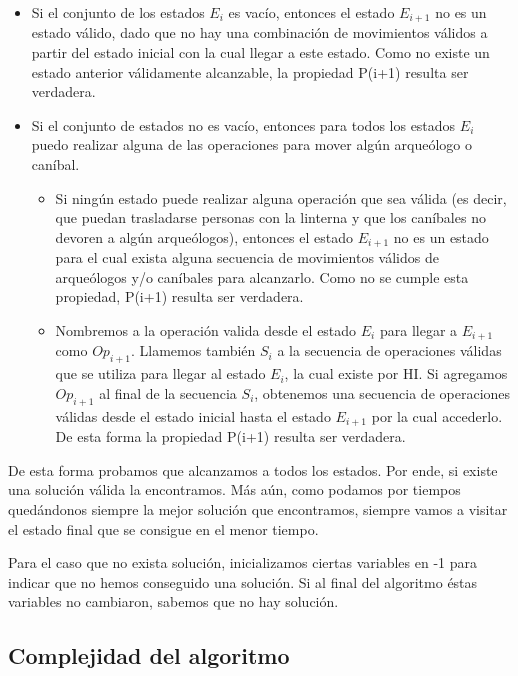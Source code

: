 \begin{itemize}
    \item Si el conjunto de los estados $E_i$ es vacío, entonces el estado $E_{i+1}$ no es un estado válido, dado que no hay una combinación de movimientos válidos a partir del estado inicial con la cual llegar a este estado. Como no existe un estado anterior válidamente alcanzable, la propiedad P(i+1) resulta ser verdadera.

    \item Si el conjunto de estados no es vacío, entonces para todos los estados $E_{i}$ puedo realizar alguna de las operaciones para mover algún arqueólogo o caníbal. 
    \begin{itemize}
    \item Si ningún estado puede realizar alguna operación que sea válida (es decir, que puedan trasladarse personas con la linterna y que los caníbales no devoren a alg\'un arqueólogos), entonces el estado $E_{i+1}$ no es un estado para el cual exista alguna secuencia de movimientos válidos de arqueólogos y/o caníbales para alcanzarlo. Como no se cumple esta propiedad, P(i+1) resulta ser verdadera.
    
    \item Nombremos a la operación valida desde el estado $E_{i}$ para llegar a $E_{i+1}$ como $Op_{i+1}$. Llamemos también $S_i$ a la secuencia de operaciones válidas que se utiliza para llegar al estado $E_{i}$, la cual existe por HI. Si agregamos $Op_{i+1}$ al final de la secuencia $S_i$, obtenemos una secuencia de operaciones válidas desde el estado inicial hasta el estado $E_{i+1}$ por la cual accederlo. De esta forma la propiedad P(i+1) resulta ser verdadera.
    \end{itemize}
\end{itemize}


De esta forma probamos que alcanzamos a todos los estados. Por ende, si existe una solución válida la encontramos. Más aún, como podamos por tiempos quedándonos siempre la mejor solución que encontramos, siempre vamos a visitar el estado final que se consigue en el menor tiempo. 

Para el caso que no exista solución, inicializamos ciertas variables en -1 para indicar que no hemos conseguido una solución. Si al final del algoritmo éstas variables no cambiaron, sabemos que no hay solución.
\subsection{Complejidad del algoritmo}
